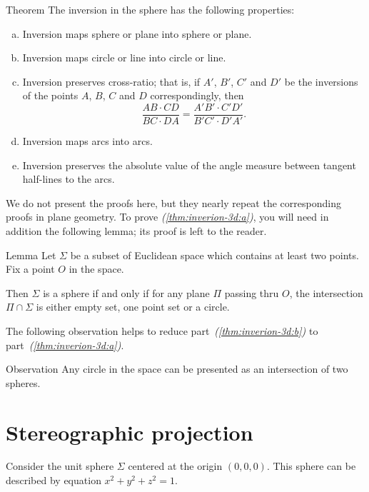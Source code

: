 \begin{thm}{Theorem}\label{thm:inverion-3d}
The inversion in the sphere has the following properties:
\begin{enumerate}[(a)]
\item\label{thm:inverion-3d:a} Inversion maps sphere or plane into sphere or plane.
\item\label{thm:inverion-3d:b} Inversion maps circle or line into circle or line. 
\item\label{thm:inverion-3d:cross-ratio} Inversion preserves cross-ratio; that is, if $A'$, $B'$, $C'$ and $D'$ be the inversions of the points $A$, $B$, $C$ and $D$ correspondingly,
then
$$\frac{AB\cdot CD}{BC\cdot DA}= \frac{A'B'\cdot C'D'}{B'C'\cdot D'A'}.$$
\item Inversion maps arcs into arcs.
\item\label{thm:inverion-3d:angle} Inversion preserves the absolute value of the angle
measure between tangent half-lines to the arcs.
\end{enumerate}
\end{thm}


We do not present the proofs here, but
they nearly repeat the corresponding proofs in plane geometry.
To prove \textit{(\ref{thm:inverion-3d:a})}, you will need in addition the following lemma;
its proof is left to the reader.

\begin{thm}{Lemma}
Let $\Sigma$ be a subset of Euclidean space
which contains at least two points.
Fix a point $O$ in the space.

Then $\Sigma$ is 
a sphere 
if and only if
for any plane $\Pi$ passing thru $O$,
the intersection $\Pi\cap \Sigma$ is either empty set,
one point set or a circle.
\end{thm}  

The following observation helps to reduce part~\textit{(\ref{thm:inverion-3d:b})} to part~\textit{(\ref{thm:inverion-3d:a})}.

\begin{thm}{Observation}
Any circle in the space can be presented as an intersection of two spheres.
\end{thm}


\section*{Stereographic projection}

Consider the unit sphere $\Sigma$ 
centered at the origin $(0,0,0)$.
This sphere can be described by equation $x^2+y^2+z^2=1$. 


